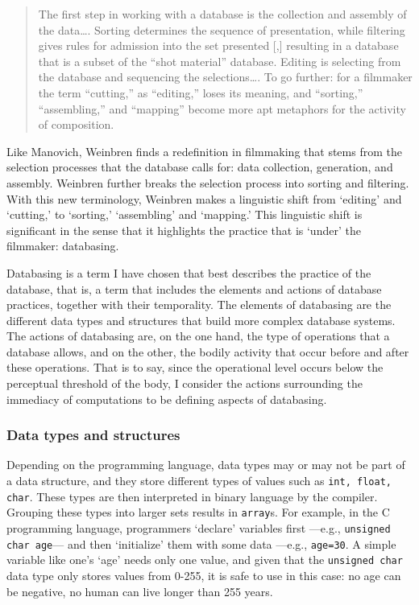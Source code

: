 \begin{quote}
	The first step in working with a database is the collection and assembly of the data\dots. Sorting determines the sequence of presentation, while filtering gives rules for admission into the set presented [,] resulting in a database that is a subset of the ``shot material'' database. Editing is selecting from the database and sequencing the selections\dots. To go further: for a filmmaker the term ``cutting,'' as ``editing,'' loses its meaning, and ``sorting,'' ``assembling,'' and ``mapping'' become more apt metaphors for the activity of composition. \parencite[71]{Wei07:Oce}
\end{quote}

Like Manovich, Weinbren finds a redefinition in filmmaking that stems from the selection processes that the database calls for: data collection, generation, and assembly. Weinbren further breaks the selection process into sorting and filtering. With this new terminology, Weinbren makes a linguistic shift from `editing' and `cutting,' to `sorting,' `assembling' and `mapping.' This linguistic shift is significant in the sense that it highlights the practice that is `under' the filmmaker: databasing. 

Databasing is a term I have chosen that best describes the practice of the database, that is, a term that includes the elements and actions of database practices, together with their temporality. The elements of databasing are the different data types and structures that build more complex database systems. The actions of databasing are, on the one hand, the type of operations that a database allows, and on the other, the bodily activity that occur before and after these operations. That is to say, since the operational level occurs below the perceptual threshold of the body, I consider the actions surrounding the immediacy of computations to be defining aspects of databasing.

\subsubsection{Data types and structures}

Depending on the programming language, data types may or may not be part of a data structure, and they store different types of values such as \texttt{int, float, char}. These types are then interpreted in binary language by the compiler. Grouping these types into larger sets results in \texttt{array}s. For example, in the C programming language, programmers `declare' variables first ---e.g., \texttt{unsigned char age}--- and then `initialize' them with some data ---e.g., \texttt{age=30}. A simple variable like one's `age' needs only one value, and given that the \texttt{unsigned char} data type only stores values from 0-255, it is safe to use in this case: no age can be negative, no human can live longer than 255 years.

